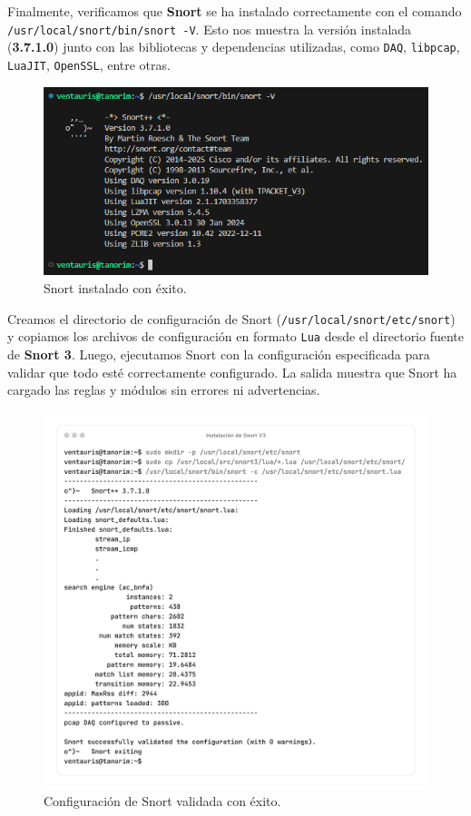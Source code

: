 \documentclass[12pt,a4paper]{report}
\begin{document}
Finalmente, verificamos que \textbf{Snort} se ha instalado correctamente con el comando \texttt{/usr/local/snort/bin/snort -V}. Esto nos muestra la versión instalada (\textbf{3.7.1.0}) junto con las bibliotecas y dependencias utilizadas, como \texttt{DAQ}, \texttt{libpcap}, \texttt{LuaJIT}, \texttt{OpenSSL}, entre otras.

\begin{figure}[H]
	\centering
	\includegraphics[scale=0.7]{instalacion_snort/24.png}
	\caption{Snort instalado con éxito.}
\end{figure}

\newpage

Creamos el directorio de configuración de Snort (\texttt{/usr/local/snort/etc/snort}) y copiamos los archivos de configuración en formato \texttt{Lua} desde el directorio fuente de \textbf{Snort 3}. Luego, ejecutamos Snort con la configuración especificada para validar que todo esté correctamente configurado. La salida muestra que Snort ha cargado las reglas y módulos sin errores ni advertencias.

\begin{figure}[H]
	\centering
	\includegraphics[scale=0.12]{instalacion_snort/25-25.png}
	\caption{Configuración de Snort validada con éxito.}
\end{figure}
\end{document}

